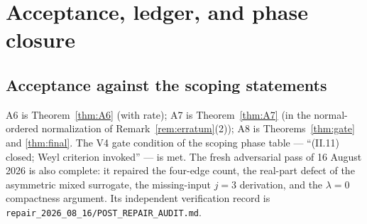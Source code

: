\documentclass[11pt,a4paper]{article}
\theoremstyle{plain}
\theoremstyle{definition}
\begin{document}
\section{Acceptance, ledger, and phase closure}\label{sec:ledger}

\subsection*{Acceptance against the scoping statements}

A6 is Theorem~\ref{thm:A6} (with rate); A7 is Theorem~\ref{thm:A7} (in
the normal-ordered normalization of Remark~\ref{rem:erratum}(2)); A8 is
Theorems~\ref{thm:gate} and \ref{thm:final}. The V4 gate condition of
the scoping phase table --- ``(II.11) closed; Weyl criterion invoked''
--- is met.  The fresh adversarial pass of 16 August 2026 is also complete:
it repaired the four-edge count, the real-part defect of the asymmetric mixed
surrogate, the missing-input $j=3$ derivation, and the $\lambda=0$ compactness
argument.  Its independent verification record is
\texttt{repair\_2026\_08\_16/POST\_REPAIR\_AUDIT.md}.
\end{document}
